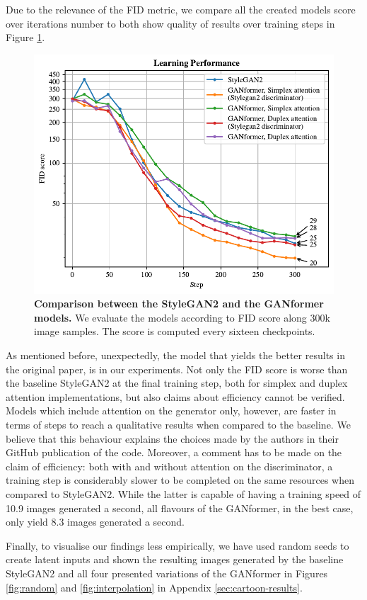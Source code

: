 \documentclass{article}
\begin{document}
Due to the relevance of the FID metric, we compare all the created models score over iterations 
number to both show quality of results over training steps in Figure \ref{fig:performance}.
\begin{figure}[htpb]				
	\centering
	\includegraphics[width=.7\linewidth]{FIDscore-cartoonset.pdf}
	\caption{\textbf{Comparison between the StyleGAN2 and the GANformer models.} We evaluate 
		the models according to FID score along 300k image samples. The score is computed every 
		sixteen checkpoints.}
	\label{fig:performance}
\end{figure}

As mentioned before, unexpectedly, the model that yields the better results in the original paper, is 
  in our experiments.
Not only the FID score is worse than the baseline StyleGAN2 at the final training step, both for 
simplex and duplex attention implementations, but also claims about efficiency cannot be verified.
Models which include attention on the generator only, however, are faster in terms of steps to reach a qualitative results when compared to the baseline.
We believe that this behaviour explains the choices made by the authors in their GitHub publication 
of the code.
Moreover, a comment has to be made on the claim of efficiency: both with and without attention on 
the discriminator, a training step is considerably slower to be completed on the same resources 
when compared to StyleGAN2.
While the latter is capable of having a training speed of 10.9 images generated a second, all flavours 
of the GANformer, in the best case, only yield 8.3 images generated a second.

Finally, to visualise our findings less empirically, we have used random seeds to create latent inputs and shown the resulting images generated by the baseline StyleGAN2 and all four presented variations of the GANformer in Figures \ref{fig:random} and \ref{fig:interpolation} in Appendix \ref{sec:cartoon-results}.
\end{document}
